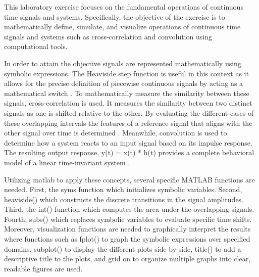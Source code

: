 This laboratory exercise focuses on the fundamental operations of continuous time signals and systems. 
Specifically, the objective of the exercise is to mathematically define, simulate, and visualize operations of continuous 
time signals and systems such as cross-correlation and convolution using computational tools. 

In order to attain the objective signals are represented mathematically using symbolic expressions. 
The Heaviside step function is useful in this context as it allows for the precise definition of piecewise continuous signals 
by acting as a mathematical switch \cite{oppenheim1997}. To mathematically measure the similarity between these signals, 
cross-correlation is used. It measures the similarity between two distinct signals as one is shifted relative to the other. 
By evaluating the different cases of these overlapping intervals the features of a reference signal that aligns with the other 
signal over time is determined \cite{haykin1999}. Meanwhile, convolution is used to determine how a system reacts to an input 
signal based on its impulse response. The resulting output response, y(t) = x(t) * h(t) provides a complete behavioral model of a 
linear time-invariant system \cite{haykin1999}.

Utilizing matlab to apply these concepts, several specific MATLAB functions are needed. 
First, the syms function which initializes symbolic variables. Second, heaviside() which constructs the discrete transitions in the 
signal amplitudes. Third, the int() function which computes the area under the overlapping signals. Fourth, subs() which replaces symbolic 
variables to evaluate specific time shifts. Moreover, visualization functions are needed to graphically interpret the results where 
functions such as fplot() to graph the symbolic expressions over specified domains, subplot() to display the different plots side-by-side, 
title() to add a descriptive title to the plots, and grid on to organize multiple graphs into clear, readable figures are used. 